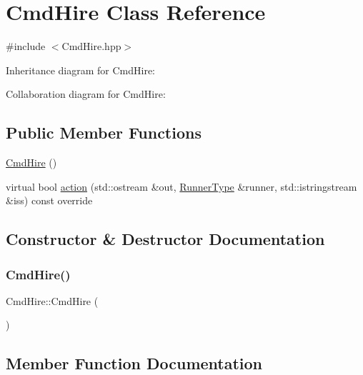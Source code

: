 \hypertarget{classCmdHire}{}\section{Cmd\+Hire Class Reference}
\label{classCmdHire}


{\ttfamily \#include $<$Cmd\+Hire.\+hpp$>$}



Inheritance diagram for Cmd\+Hire\+:


Collaboration diagram for Cmd\+Hire\+:
\subsection*{Public Member Functions}
\begin{DoxyCompactItemize}
\item 
\hyperlink{classCmdHire_ab75bb512e3485fab4709acd59d864f52}{Cmd\+Hire} ()
\item 
virtual bool \hyperlink{classCmdHire_ae719bbe66d668f79def7555bffa0932b}{action} (std\+::ostream \&out, \hyperlink{Command_8hpp_a3594ceaf3c835811a9a67810e7af19f9}{Runner\+Type} \&runner, std\+::istringstream \&iss) const override
\end{DoxyCompactItemize}


\subsection{Constructor \& Destructor Documentation}
\mbox{\label{classCmdHire_ab75bb512e3485fab4709acd59d864f52}} 
\subsubsection{\texorpdfstring{Cmd\+Hire()}{CmdHire()}}
{\footnotesize\ttfamily Cmd\+Hire\+::\+Cmd\+Hire (\begin{DoxyParamCaption}{ }\end{DoxyParamCaption})}



\subsection{Member Function Documentation}
\mbox{\label{classCmdHire_ae719bbe66d668f79def7555bffa0932b}} 
